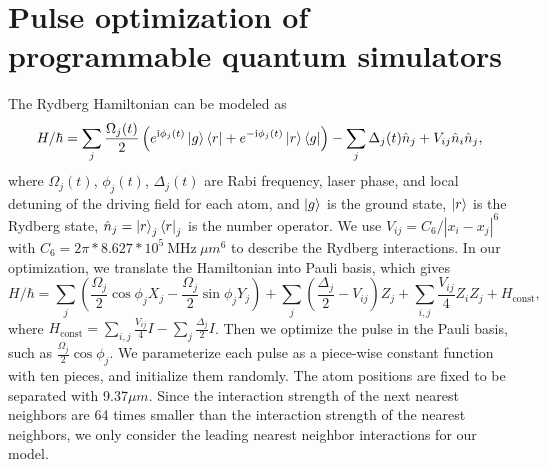 \documentclass[a4paper,accepted=2024-07-10]{quantumarticle}
\newcommand{\ii}{\mathrm{i}}
\begin{document}
\section{\label{app:Rydberg}Pulse optimization of programmable quantum simulators}
The Rydberg Hamiltonian can be modeled as 
\begin{equation}
H/\hbar=\sum_{j}\dfrac{\Omega_j(t)}{2}\left(e^{\ii \phi_j(t)}\ket{g}\bra{r}+e^{-\ii \phi_j(t)}\ket{r}\bra{g}\right)-\sum_{j}\Delta_j(t)\hat{n}_j+V_{ij}\hat{n}_{i}\hat{n}_j,    
\end{equation}
where $\Omega_j(t)$, $\phi_j(t)$, $\Delta_j(t)$ are Rabi frequency, laser phase, and local detuning of the driving field for each atom, and $\ket{g}$ is the ground state, $\ket{r}$ is the Rydberg state, $\hat{n}_j=\ket{r}_j\bra{r}_j$ is the number operator. We use $V_{ij}=C_6/|x_i-x_j|^6$ with $C_6=2\pi*8.627*10^5 ~\text{MHz}~\mu m^6$ to describe the Rydberg interactions. In our optimization, we translate the Hamiltonian into Pauli basis, which gives
\begin{equation}
    H/\hbar=\sum_j \left(\dfrac{\Omega_j}{2}\cos \phi_j X_j-\dfrac{\Omega_j}{2}\sin \phi_j Y_j\right)+\sum_{j}\left(\dfrac{\Delta_j}{2}-V_{ij}\right)Z_j+\sum_{i,j}\dfrac{V_{ij}}{4}Z_i Z_j+H_{\text{const}},
\end{equation}
where $H_{\text{const}}=\sum_{i,j}\frac{V_{ij}}{4}I-\sum_j \frac{\Delta_j}{2}I$. Then we optimize the pulse in the Pauli basis, such as $\frac{\Omega_j}{2}\cos \phi_j$. We parameterize each pulse as a piece-wise constant function with ten pieces, and initialize them randomly. The atom positions are fixed to be separated with 9.37$\mu m$. Since the interaction strength of the next nearest neighbors are 64 times smaller than the interaction strength of the nearest neighbors, we only consider the leading nearest neighbor interactions for our model.
\end{document}
